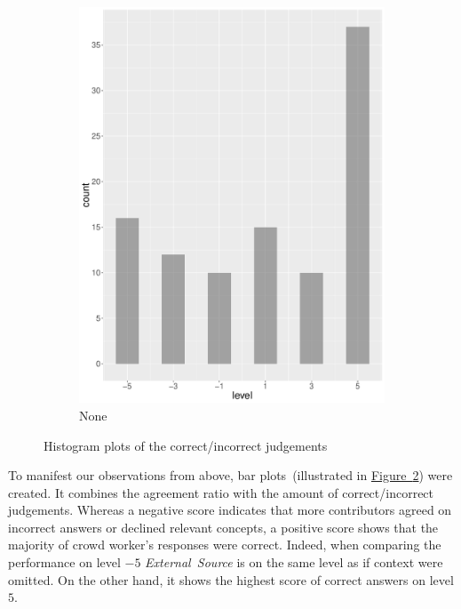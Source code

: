 \begin{figure}
\begin{subfigure}[b]{0.4\textwidth}
        \includegraphics[width=\textwidth]{plots/climate_change/hist_level_none}
        \caption{None}
        \label{fig:hist_level_climate_change_none}
    \end{subfigure}
    \caption{Histogram plots of the correct/incorrect judgements}\label{fig:hist_level_climate_change_all}
\end{figure}

To manifest our observations from above, bar plots~(illustrated in \hyperref[fig:hist_level_climate_change_all]{Figure~\ref*{fig:hist_level_climate_change_all}}) were created. It combines the agreement ratio with the amount of correct/incorrect judgements. Whereas a negative score indicates that more contributors agreed on incorrect answers or declined relevant concepts, a positive score shows that the majority of crowd worker's responses were correct. Indeed, when comparing the performance on level $-5$ \emph{External~Source} is on the same level as if context were omitted. On the other hand, it shows the highest score of correct answers on level $5$.

